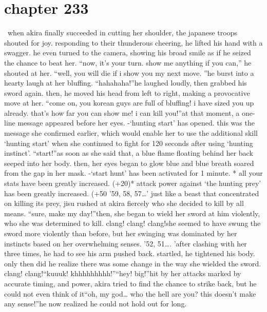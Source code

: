 \section{chapter 233}






 when akira finally succeeded in cutting her shoulder, the japanese troops shouted for joy.
responding to their thunderous cheering, he lifted his hand with a swagger.
 he even turned to the camera, showing his broad smile as if he seized the chance to beat her.
“now, it’s your turn.
 show me anything if you can,” he shouted at her.
“well, you will die if i show you my next move.
”he burst into a hearty laugh at her bluffing.
“hahahaha!”he laughed loudly, then grabbed his sword again.
 then, he moved his head from left to right, making a provocative move at her.
“come on, you korean guys are full of bluffing! i have sized you up already.
 that’s how far you can show me! i can kill you!”at that moment, a one-line message appeared before her eyes.
-‘hunting start’ has opened.
this was the message she confirmed earlier, which would enable her to use the additional skill ‘hunting start’ when she continued to fight for 120 seconds after using ‘hunting instinct’.
“start!”as soon as she said that, a blue flame floating behind her back seeped into her body.
then, her eyes began to glow blue and blue breath soared from the gap in her mask.
-‘start hunt’ has been activated for 1 minute.
* all your stats have been greatly increased.
 (+20)* attack power against ‘the hunting prey’ has been greatly increased.
 (+50%
’59, 58, 57…’
just like a beast that concentrated on killing its prey, jisu rushed at akira fiercely who she decided to kill by all means.
“sure, make my day!”then, she began to wield her sword at him violently, who she was determined to kill.
clang! clang! clang!she seemed to have swung the sword more violently than before, but her swinging was dominated by her instincts based on her overwhelming senses.
’52, 51….
’after clashing with her three times, he had to see his arm pushed back.
 startled, he tightened his body.
 only then did he realize there was some change in the way she wielded the sword.
clang! clang!“kuuuk! khhhhhhhhh!”“hey! big!”hit by her attacks marked by accurate timing, and power, akira tried to find the chance to strike back, but he could not even think of it“oh, my god… who the hell are you? this doesn’t make any sense!”he now realized he could not hold out for long.
